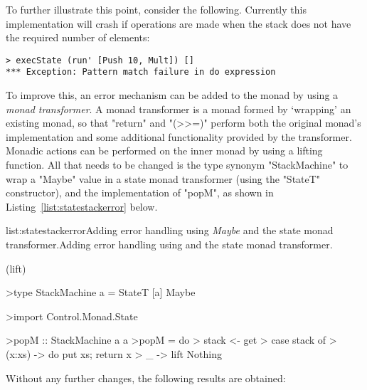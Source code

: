 To further illustrate this point, consider the following. Currently this implementation will crash if operations are made when the stack does not have the required number of elements:

\begin{verbatim}
> execState (run' [Push 10, Mult]) []
*** Exception: Pattern match failure in do expression
\end{verbatim}

\noindent To improve this, an error mechanism can be added to the monad by using a \emph{monad transformer}. A monad transformer is a monad formed by `wrapping' an existing monad, so that "return" and "(>>=)" perform both the original monad's implementation and some additional functionality provided by the transformer. Monadic actions can be performed on the inner monad by using a lifting function. All that needs to be changed is the type synonym "StackMachine" to wrap a "Maybe" value in a state monad transformer (using the "StateT" constructor), and the implementation of "popM", as shown in Listing~\ref{list:statestackerror} below.

\vspace{-0.5em}
\begin{listing}{list:statestackerror}{Adding error handling using \emph{Maybe} and the state monad transformer.}{Adding error handling using  and the state monad transformer.}{}
\end{listing}\vspace{-1.5em}

\functions(lift)
\begin{haskell}

>type StackMachine a = StateT [a] Maybe

>import Control.Monad.State

>popM :: StackMachine a a
>popM = do
>  stack <- get
>  case stack of
>    (x:xs) -> do put xs; return x
>    _ -> lift Nothing


\end{haskell}
\noindent Without any further changes, the following results are obtained:

